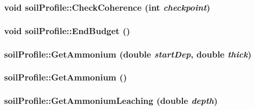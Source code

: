 \label{classsoil_profile_a626f77b25f2ebf34e48b46fbc4c27088}
\hypertarget{classsoil_profile_a720227a11c5b7d42ff847bca13ea9ed2}{
\subsubsection[{CheckCoherence}]{\setlength{\rightskip}{0pt plus 5cm}void soilProfile::CheckCoherence (int {\em checkpoint})}}
\label{classsoil_profile_a720227a11c5b7d42ff847bca13ea9ed2}
\hypertarget{classsoil_profile_af7441e5aa2d37028f2d8539bffba3580}{
\subsubsection[{EndBudget}]{\setlength{\rightskip}{0pt plus 5cm}void soilProfile::EndBudget ()}}
\label{classsoil_profile_af7441e5aa2d37028f2d8539bffba3580}
\hypertarget{classsoil_profile_ae5719e1e82452eefb240900a9e62e27d}{
\subsubsection[{GetAmmonium}]{ soilProfile::GetAmmonium (double {\em startDep}, \/  double {\em thick})}}
\label{classsoil_profile_ae5719e1e82452eefb240900a9e62e27d}
\hypertarget{classsoil_profile_ae08f75a5b3b0af43054c75f7c6b0867e}{
\subsubsection[{GetAmmonium}]{ soilProfile::GetAmmonium ()}}
\label{classsoil_profile_ae08f75a5b3b0af43054c75f7c6b0867e}
\hypertarget{classsoil_profile_a5714479e1a3ca3d9c0669dbdfedf3b57}{
\subsubsection[{GetAmmoniumLeaching}]{ soilProfile::GetAmmoniumLeaching (double {\em depth})}}
